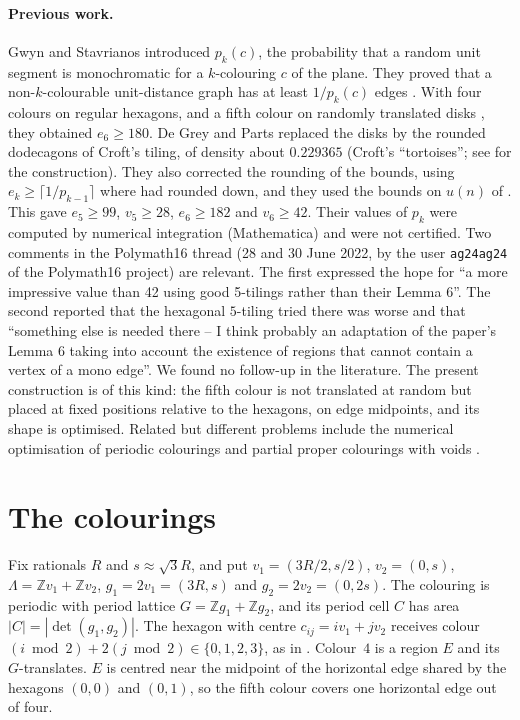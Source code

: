 \documentclass[10pt,a4paper]{article}
\newcommand{\Z}{\mathbb{Z}}
\begin{document}
\paragraph{Previous work.} Gwyn and Stavrianos \cite{GS} introduced $p_k(c)$, the probability that a
random unit segment is monochromatic for a $k$-colouring $c$ of the plane. They proved that a
non-$k$-colourable unit-distance graph has at least $1/p_k(c)$ edges \cite[Lemma~2.10]{GS}. With four
colours on regular hexagons, and a fifth colour on randomly translated disks
\cite[Lemma~2.23]{GS}, they obtained $e_6\ge180$. De Grey and Parts \cite{dGP} replaced the disks by
the rounded dodecagons of Croft's tiling, of density about $0.229365$ (Croft's ``tortoises''; see
\cite{KMOR} for the construction). They also corrected the rounding of the bounds, using
$e_k\ge\lceil1/p_{k-1}\rceil$ where \cite{GS} had rounded down, and they used the bounds on $u(n)$ of
\cite{AP}. This gave $e_5\ge99$, $v_5\ge28$, $e_6\ge182$ and $v_6\ge42$. Their values of $p_k$ were
computed by numerical integration (Mathematica) and were not certified. Two comments in the
Polymath16 thread \cite{PM16} (28 and 30 June 2022, by the user \texttt{ag24ag24} of the Polymath16 project) are relevant. The first expressed
the hope for ``a more impressive value than 42 using good 5-tilings rather than their Lemma 6''. The
second reported that the hexagonal $5$-tiling tried there was worse and that ``something else is needed there --
I think probably an adaptation of the paper's Lemma 6 taking into account the existence of regions
that cannot contain a vertex of a mono edge''. We found no follow-up in the literature. The present construction is of
this kind: the fifth colour is not translated at random but placed at fixed positions relative to the
hexagons, on edge midpoints, and its shape is optimised. Related
but different problems include the numerical optimisation of periodic colourings
\cite{Mundinger} and partial proper colourings with voids \cite{Parts}.

\section{The colourings}

Fix rationals $R$ and $s\approx\sqrt3R$, and put $v_1=(3R/2,s/2)$, $v_2=(0,s)$, $\Lambda=\Z v_1+\Z v_2$,
$g_1=2v_1=(3R,s)$ and $g_2=2v_2=(0,2s)$. The colouring is periodic with period lattice
$G=\Z g_1+\Z g_2$, and its period cell $C$ has area $|C|=|\det(g_1,g_2)|$. The hexagon with centre
$c_{ij}=iv_1+jv_2$ receives colour $(i\bmod 2)+2(j\bmod 2)\in\{0,1,2,3\}$, as in \cite[Fig.~6]{GS}. Colour~$4$
is a region $E$ and its $G$-translates. $E$ is centred near the midpoint of the horizontal edge
shared by the hexagons $(0,0)$ and $(0,1)$, so the fifth colour covers one horizontal edge out of four.
\end{document}
